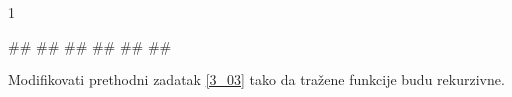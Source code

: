 \begin{Exercise}[label=3_03]
\begin{miditest}
\begin{test2}{1}
  
#\naslovInt#
##
##
##
## 
##
\end{test2}
\end{miditest}


\end{Exercise}

\begin{Answer}[ref=3_03]
\end{Answer}
\begin{Exercise}[label=3_04]
  Modifikovati prethodni zadatak \ref{3_03} tako da tražene funkcije
  budu rekurzivne.


\end{Exercise}

